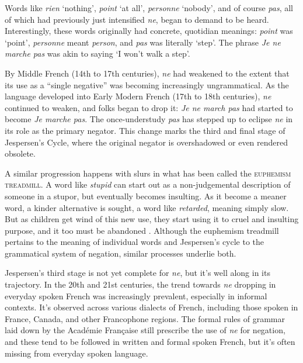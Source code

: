 Words like \textit{rien} `nothing', \textit{point} `at all', \textit{personne} `nobody', and of course \textit{pas}, all of which had previously just intensified \textit{ne}, began to demand to be heard. Interestingly, these words originally had concrete, quotidian meanings: \textit{point} was `point', \textit{personne} meant \textit{person}, and \textit{pas} was literally `step'. The phrase \textit{Je ne marche pas} was akin to saying `I won't walk a step'.

By Middle French (14th to 17th centuries), \textit{ne} had weakened to the extent that its use as a ``single negative'' was becoming increasingly ungrammatical. As the language developed into Early Modern French (17th to 18th centuries), \textit{ne} continued to weaken, and folks began to drop it: \textit{Je ne march pas} had started to become \textit{Je marche pas}. The once-understudy \textit{pas} has stepped up to eclipse \textit{ne} in its role as the primary negator. This change marks the third and final stage of Jespersen's Cycle, where the original negator is overshadowed or even rendered obsolete.

A similar progression happens with slurs in what has been called the \textsc{euphemism treadmill}. A word like \textit{stupid} can start out as a non-judgemental description of someone in a stupor, but eventually becomes insulting. As it become a meaner word, a kinder alternative is sought, a word like \textit{retarded}, meaning simply slow. But as children get wind of this new use, they start using it to cruel and insulting purpose, and it too must be abandoned \citep{Taylor1974}. Although the euphemism treadmill pertains to the meaning of individual words and Jespersen's cycle to the grammatical system of negation, similar processes underlie both.

Jespersen's third stage is not yet complete for \textit{ne}, but it's well along in its trajectory. In the 20th and 21st centuries, the trend towards \textit{ne} dropping in everyday spoken French was increasingly prevalent, especially in informal contexts. It's observed across various dialects of French, including those spoken in France, Canada, and other Francophone regions. The formal rules of grammar laid down by the Académie Française still prescribe the use of \textit{ne} for negation, and these tend to be followed in written and formal spoken French, but it's often missing from everyday spoken language.

